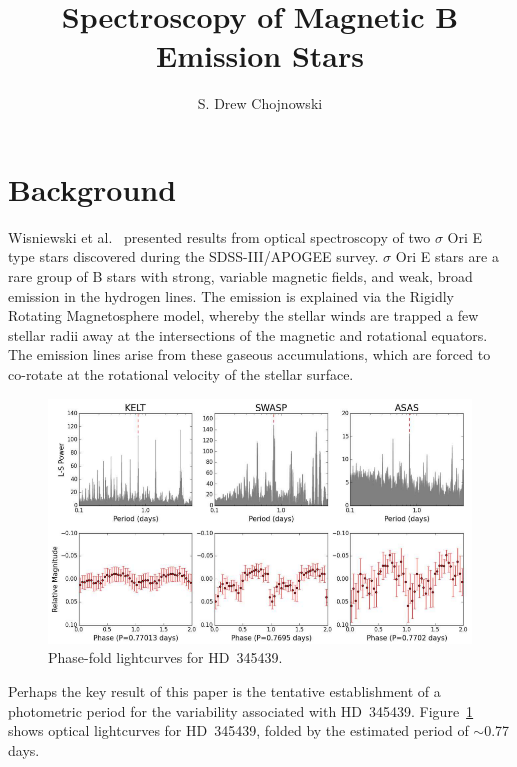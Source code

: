 \documentclass{article}
\begin{document}


\title{Spectroscopy of Magnetic B Emission Stars}


\author{S. Drew Chojnowski}

\vspace{0.5cm}

\section{Background}

Wisniewski et al.~\cite{wis15} presented results from optical spectroscopy of two $\sigma$ Ori E type stars discovered during the SDSS-III/APOGEE survey. $\sigma$ Ori E stars are a rare group of B stars with strong, variable magnetic fields, and weak, broad emission in the hydrogen lines. The emission is explained via the Rigidly Rotating Magnetosphere model, whereby the stellar winds are trapped a few stellar radii away at the intersections of the magnetic and rotational equators. The emission lines arise from these gaseous accumulations, which are forced to co-rotate at the rotational velocity of the stellar surface.

\begin{figure}[h!]
\includegraphics[angle=0,scale=.4]{Screenshot-23.png}
\caption{Phase-fold lightcurves for HD~345439. \label{fig1}}
\end{figure}

Perhaps the key result of this paper is the tentative establishment of a photometric period for the variability associated with HD~345439. Figure~\ref{fig1} shows optical lightcurves for HD~345439, folded by the estimated period of $\sim$0.77 days.



{}
\end{document}
